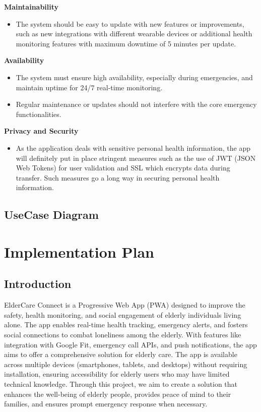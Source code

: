 \documentclass[a4paper, 12pt]{article}
\begin{document}
\textbf{Maintainability }
\begin{itemize}
    \item The system should be easy to update with new features or improvements, such as new integrations with different wearable devices or additional health monitoring features with maximum downtime of 5 minutes per update.
\end{itemize}
\textbf{Availability }
\begin{itemize}
    \item The system must ensure high availability, especially during emergencies, and maintain uptime for 24/7 real-time monitoring.
    \item Regular maintenance or updates should not interfere with the core emergency functionalities.
\end{itemize}
\textbf{Privacy and Security }
\begin{itemize}
    \item As the application deals with sensitive personal health information, the app will definitely put in place stringent measures such as the use of JWT (JSON Web Tokens) for user validation and SSL which encrypts data during transfer. Such measures go a long way in securing personal health information.
\end{itemize}

\subsection{ UseCase Diagram}

\newpage
\newpage
\section{\textbf{\LARGE Implementation Plan}}

\subsection{ Introduction}
ElderCare Connect is a Progressive Web App (PWA) designed to improve the safety, health monitoring, and social engagement of elderly individuals living alone. The app enables real-time health tracking, emergency alerts, and fosters social connections to combat loneliness among the elderly. With features like integration with Google Fit, emergency call APIs, and push notifications, the app aims to offer a comprehensive solution for elderly care.  
The app is available across multiple devices (smartphones, tablets, and desktops) without requiring installation, ensuring accessibility for elderly users who may have limited technical knowledge. Through this project, we aim to create a solution that enhances the well-being of elderly people, provides peace of mind to their families, and ensures prompt emergency response when necessary.
\end{document}
